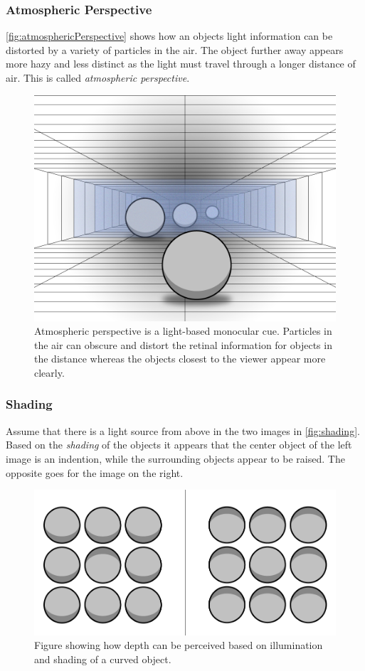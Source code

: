 \subsubsection{Atmospheric Perspective}
\autoref{fig:atmosphericPerspective} shows how an objects light information can be distorted by a variety of particles in the air. The object further away appears more hazy and less distinct as the light must travel through a longer distance of air. This is called \textit{atmospheric perspective}\citep[p.~202]{sensationPerception}.
\begin{figure}[H]
	\centering
	\includegraphics[width=0.8\linewidth]{figure/Analysis/atmosphericPerspective2.png}
	\caption{Atmospheric perspective is a light-based monocular cue. Particles in the air can obscure and distort the retinal information for objects in the distance whereas the objects closest to the viewer appear more clearly.}
	\label{fig:atmosphericPerspective}
\end{figure}

\subsubsection{Shading}
Assume that there is a light source from above in the two images in \autoref{fig:shading}. Based on the \textit{shading} of the objects it appears that the center object of the left image is an indention, while the surrounding objects appear to be raised. The opposite goes for the image on the right\citep[p.~202]{sensationPerception}.
\begin{figure}[H]
	\centering
	\includegraphics[width=0.8\linewidth]{figure/Analysis/shading.png}
	\caption{Figure showing how depth can be perceived based on illumination and shading of a curved object.}
	\label{fig:shading}
\end{figure}

